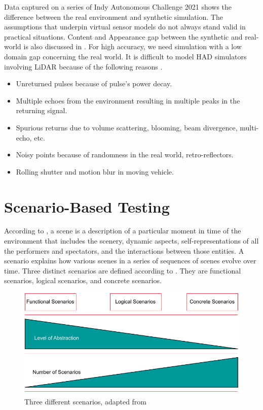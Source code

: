 Data captured on a series of Indy Autonomous Challenge 2021 \parencite{sauerbeck_learn_Year} shows the difference between the real environment and synthetic simulation. The assumptions that underpin virtual sensor models do not always stand valid in practical situations. Content and Appearance gap between the synthetic and real-world is also discussed in \parencite{care_real_and_syn_gap}. For high accuracy, we need simulation with a low domain gap concerning the real world. It is difficult to model HAD simulators involving LiDAR because of the following reasons \parencite{zero_domain_gap}. 
\begin{itemize}
    \item Unreturned pulses because of pulse's power decay.
    \item Multiple echoes from the environment resulting in multiple peaks in the returning signal.
    \item Spurious returns due to volume scattering, blooming, beam divergence, multi-echo, etc.
    \item Noisy points because of randomness in the real world, retro-reflectors.
    \item Rolling shutter and motion blur in moving vehicle.
\end{itemize}

\section{Scenario-Based Testing}
According to \parencite{def_scene}, a scene is a description of a particular moment in time of the environment that includes the scenery, dynamic aspects, self-representations of all the performers and spectators, and the interactions between those entities. A scenario explains how various scenes in a series of sequences of scenes evolve over time. Three distinct scenarios are defined according to \parencite{menzel2018scenarios}. They are functional scenarios, logical scenarios, and concrete scenarios. 

\begin{figure}[htbp]
    \centering
    \includegraphics[width=0.75\linewidth]{97_graphics/related_work/three_different_scenarios.pdf}
    \caption{Three different scenarios, adapted from \parencite{menzel2018scenarios}}
    \label{fig:related_work-3scenarios}
\end{figure}

